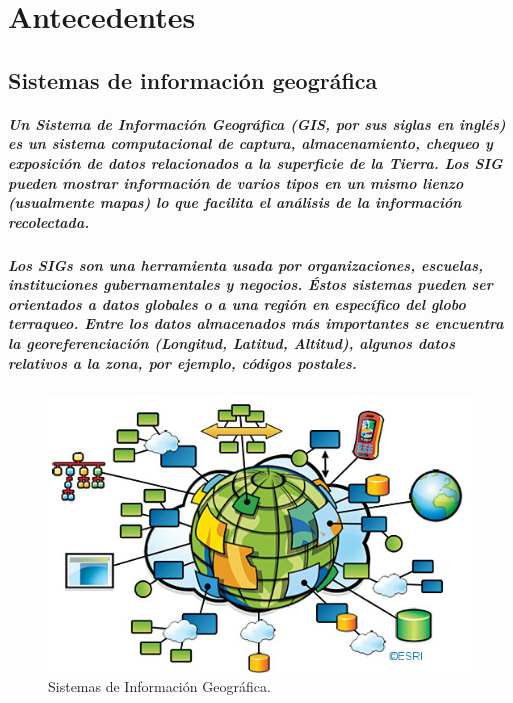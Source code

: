 \chapter {Antecedentes}
\section {Sistemas de información geográfica}
  \paragraph {Un Sistema de Información Geográfica (GIS, por sus siglas en inglés) es un sistema computacional de captura, almacenamiento, chequeo y exposición de datos relacionados a la superficie de la Tierra. Los SIG pueden mostrar información de varios tipos en un mismo lienzo (usualmente mapas) lo que facilita el análisis de la información recolectada.\cite{5}}

  \paragraph{Los SIGs son una herramienta usada por organizaciones, escuelas, instituciones gubernamentales y negocios. Éstos sistemas pueden ser orientados a datos globales o a una región en específico del globo terraqueo. Entre los datos almacenados más importantes se encuentra la georeferenciación (Longitud, Latitud, Altitud), algunos datos relativos a la zona, por ejemplo, códigos postales.}

  \begin{figure}[h!]
      \centering
        \includegraphics[width=\textwidth]{./images/GIS.jpg}
      \caption{Sistemas de Información Geográfica. \cite{18}}
  \end{figure}

